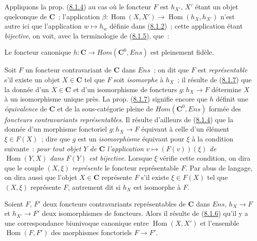 \begin{env}[8.1.6]
\label{0.8.1.6-fr}
Appliquons la prop. (\hyperref[0.8.1.4-fr]{8.1.4}) au cas où le foncteur $F$
est $h_{X'}$, $X'$ étant un objet quelconque de $\boldsymbol{C}$~; l'application
$\beta:\operatorname{Hom}(X,X')\to\operatorname{Hom}(h_X,h_{X'})$ n'est
autre ici que l'application $w\mapsto h_w$ définie dans
(\hyperref[0.8.1.2-fr]{8.1.2})~; cette application étant \emph{bijective},
on voit, avec la terminologie de (\hyperref[0.8.1.5-fr]{8.1.5}), que~:
\end{env}

\begin{proposition}[8.1.7]
\label{0.8.1.7-fr}
Le foncteur canonique
$h:\boldsymbol{C}\to\boldsymbol{\mathit{Hom}}(\boldsymbol{C}^0,\boldsymbol{\mathit{Ens}})$ est pleinement fidèle.
\end{proposition}

\begin{env}[8.1.8]
\label{0.8.1.8-fr}
Soit $F$ un foncteur contravariant de $\boldsymbol{C}$ dans $\boldsymbol{\mathit{Ens}}$~; on dit que
$F$ est \emph{représentable} s'il existe un objet $X\in\boldsymbol{C}$ tel que $F$ soit
\emph{isomorphe} à $h_X$~; il résulte de
(\hyperref[0.8.1.7-fr]{8.1.7}) que la donnée d'un $X\in\boldsymbol{C}$ et d'un
isomorphisme de foncteurs $g:h_X\to F$ détermine $X$ à un isomorphisme
unique près. La prop. (\hyperref[0.8.1.7-fr]{8.1.7}) signifie encore que $h$
définit une \emph{équivalence} de $\boldsymbol{C}$ et de la sous-catégorie pleine de
$\boldsymbol{\mathit{Hom}}(\boldsymbol{C}^0,\boldsymbol{\mathit{Ens}})$ formée des \emph{foncteurs
contravariants représentables}. Il résulte d'ailleurs de
(\hyperref[0.8.1.4-fr]{8.1.4}) que la donnée d'un morphisme fonctoriel
$g:h_X\to F$ équivaut à celle d'un élément $\xi\in F(X)$~; dire que $g$ est
un \emph{isomorphisme} équivaut pour $\xi$ à la condition suivante~:
\emph{pour tout objet $Y$ de $\boldsymbol{C}$ l'application
$v\mapsto(F(v))(\xi)$ de $\operatorname{Hom}(Y,X)$ dans $F(Y)$ est
bijective}. Lorsque $\xi$ vérifie cette condition, on dira que le couple
$(X,\xi)$ \emph{représente} le foncteur représentable $F$. Par abus de
langage, on dira aussi que l'objet $X\in\boldsymbol{C}$ représente $F$ s'il existe
$\xi\in F(X)$ tel que $(X,\xi)$ représente $F$, autrement dit si $h_X$ est
isomorphe à $F$.

Soient $F$, $F'$ deux foncteurs contravariants représentables de $\boldsymbol{C}$ dans
$\boldsymbol{\mathit{Ens}}$, $h_X\to F$ et $h_{X'}\to F'$ deux isomorphismes de
foncteurs. Alors il résulte de (\hyperref[0.8.1.6-fr]{8.1.6}) qu'il y a une
correspondance biunivoque canonique entre $\operatorname{Hom}(X,X')$ et
l'ensemble $\operatorname{Hom}(F,F')$ des morphismes fonctoriels $F\to F'$.
\end{env}

